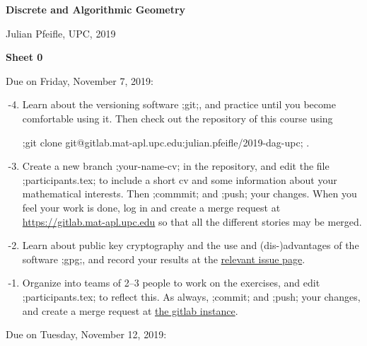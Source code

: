 \documentclass[11pt]{amsart}
\begin{document}
\begin{center}
\textbf{\sffamily
   Discrete and Algorithmic Geometry }

 \bigskip
 Julian Pfeifle,
   UPC, 2019

   \bigskip
   \textbf{\sffamily Sheet 0}
 \end{center}

  \bigskip\bigskip
 \begin{center}
  \color{blue}Due on Friday, November 7, 2019:
\end{center}


\begin{enumerate}
  \setcounter{enumi}{-5}
\item
  Learn about the versioning software ;git;, and practice until you become comfortable using it.
  Then check out the repository of this course using
  \begin{center}
    ;git clone git@gitlab.mat-apl.upc.edu:julian.pfeifle/2019-dag-upc; .
  \end{center}

  \medskip
\item
  Create a new branch ;your-name-cv; in the repository, and edit the file ;participants.tex; to include a short cv and some information about your mathematical interests.
  Then ;commmit; and ;push; your changes. When you feel your work is done, log in and create a merge request at \href{https://gitlab.mat-apl.upc.edu/julian.pfeifle/2019-dag-upc/issues/1}{https://gitlab.mat-apl.upc.edu} so that all the different stories may be merged.
  
  \medskip
\item
  Learn about public key cryptography and the use and (dis-)advantages of the software ;gpg;, and record your results at the \href{https://gitlab.mat-apl.upc.edu/julian.pfeifle/2019-dag-upc/issues/2}{relevant issue page}.

  \medskip
\item
  Organize into teams of 2--3 people to work on the exercises, and
  edit  ;participants.tex; to reflect this.
  As always, ;commit; and ;push; your changes, and create a merge request at \href{https://gitlab.mat-apl.upc.edu/julian.pfeifle/2019-dag-upc/issues/1}{the gitlab instance}.
\end{enumerate}

\bigskip\bigskip
\begin{center}
  \color{blue}Due on Tuesday, November 12, 2019:
\end{center}
\end{document}
